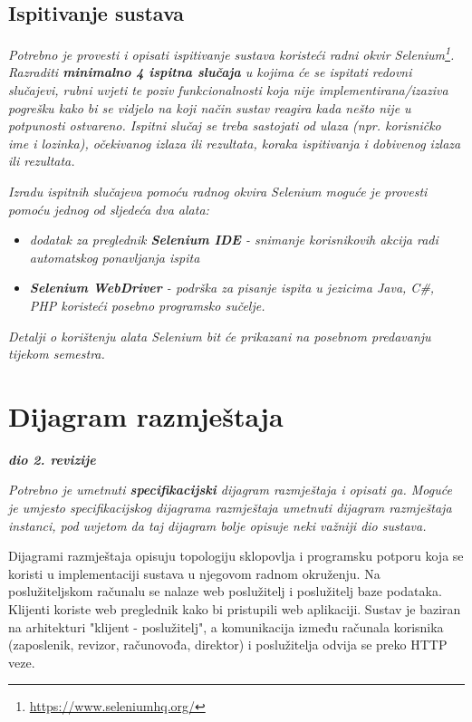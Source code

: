 			
			
			\subsection{Ispitivanje sustava}
			
			 \textit{Potrebno je provesti i opisati ispitivanje sustava koristeći radni okvir Selenium\footnote{\url{https://www.seleniumhq.org/}}. Razraditi \textbf{minimalno 4 ispitna slučaja} u kojima će se ispitati redovni slučajevi, rubni uvjeti te poziv funkcionalnosti koja nije implementirana/izaziva pogrešku kako bi se vidjelo na koji način sustav reagira kada nešto nije u potpunosti ostvareno. Ispitni slučaj se treba sastojati od ulaza (npr. korisničko ime i lozinka), očekivanog izlaza ili rezultata, koraka ispitivanja i dobivenog izlaza ili rezultata.\\ }
			 
			 \textit{Izradu ispitnih slučajeva pomoću radnog okvira Selenium moguće je provesti pomoću jednog od sljedeća dva alata:}
			 \begin{itemize}
			 	\item \textit{dodatak za preglednik \textbf{Selenium IDE} - snimanje korisnikovih akcija radi automatskog ponavljanja ispita	}
			 	\item \textit{\textbf{Selenium WebDriver} - podrška za pisanje ispita u jezicima Java, C\#, PHP koristeći posebno programsko sučelje.}
			 \end{itemize}
		 	\textit{Detalji o korištenju alata Selenium bit će prikazani na posebnom predavanju tijekom semestra.}
			
			\eject 
		
		
		\section{Dijagram razmještaja}
			
			\textbf{\textit{dio 2. revizije}}
			
			 \textit{Potrebno je umetnuti \textbf{specifikacijski} dijagram razmještaja i opisati ga. Moguće je umjesto specifikacijskog dijagrama razmještaja umetnuti dijagram razmještaja instanci, pod uvjetom da taj dijagram bolje opisuje neki važniji dio sustava.}

			 Dijagrami razmještaja opisuju topologiju sklopovlja i programsku potporu koja se koristi u implementaciji sustava u njegovom radnom okruženju. Na poslužiteljskom računalu se nalaze web poslužitelj i poslužitelj baze podataka. Klijenti koriste web preglednik kako bi pristupili web aplikaciji. Sustav je baziran na arhitekturi "klijent - poslužitelj", a komunikacija između računala korisnika (zaposlenik, revizor, računovođa, direktor) i poslužitelja odvija se preko HTTP veze.

